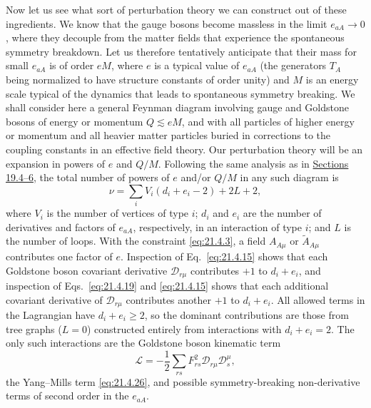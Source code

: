 Now let us see what sort of perturbation theory we can construct out of these ingredients. We know that the gauge bosons become massless in the limit $e_{a A}\to0$, where they decouple from the matter fields that experience the spontaneous symmetry breakdown. Let us therefore tentatively anticipate that their mass for small $e_{a A}$ is of order $eM$, where $e$ is a typical value of $e_{a A}$ (the generators $T_A$ being normalized to have structure constants of order unity) and $M$ is an energy scale typical of the dynamics that leads to spontaneous symmetry breaking. We shall consider here a general Feynman diagram involving gauge and Goldstone bosons of energy or momentum $Q\lesssim eM$, and with all particles of higher energy or momentum and all heavier matter particles buried in corrections to the coupling constants in an effective field theory. Our perturbation theory will be an expansion in powers of $e$ and $Q/M$. Following the same analysis as in \hyperref[sec:19.4]{Sections 19.4--6}, the total number of powers of $e$ and/or $Q/M$ in any such diagram is
\begin{equation}
\nu=\sum_iV_i(d_i+e_i-2)+2L+2,
\tag{21.4.27}\label{eq:21.4.27}
\end{equation}
where $V_i$ is the number of vertices of type $i$; $d_i$ and $e_i$ are the number of derivatives and factors of $e_{a A}$, respectively, in an interaction of type $i$; and $L$ is the number of loops. With the constraint \eqref{eq:21.4.3}, a field $A_{A\mu}$ or $\widetilde A_{A\mu}$ contributes one factor of $e$. Inspection of Eq.~\eqref{eq:21.4.15} shows that each Goldstone boson covariant derivative $\mathcal D_{r\mu}$ contributes $+1$ to $d_i+e_i$, and inspection of Eqs.~\eqref{eq:21.4.19} and \eqref{eq:21.4.15} shows that each additional covariant derivative of $\mathcal D_{r\mu}$ contributes another $+1$ to $d_i+e_i$. All allowed terms in the Lagrangian have $d_i+e_i\geq2$, so the dominant contributions are those from tree graphs ($L=0$) constructed entirely from interactions with $d_i+e_i=2$. The only such interactions are the Goldstone boson kinematic term
\begin{equation}
\mathcal L
=-\frac{1}{2}\sum_{rs}F_{rs}^2
\mathcal D_{r\mu}\mathcal D_s^\mu,
\tag{21.4.28}\label{eq:21.4.28}
\end{equation}
the Yang--Mills term \eqref{eq:21.4.26}, and possible symmetry-breaking non-derivative terms of second order in the $e_{a A}$.

